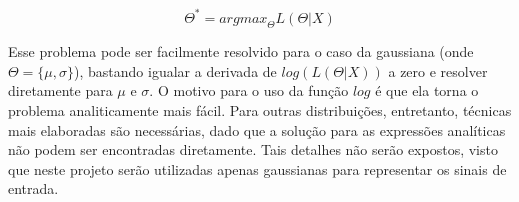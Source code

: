 \begin{equation}\label{eq:hmm14}
    {\Theta}^{\ast} = {{argmax}}_{\Theta}{L(\Theta|X)}
\end{equation}

Esse problema pode ser facilmente resolvido para o caso da gaussiana (onde $ \Theta = \{\mu,\sigma\} $), bastando igualar a derivada de $ log(L(\Theta|X)) $ a zero e resolver diretamente para $ \mu $ e $ \sigma $. O motivo para o uso da função $ log $ é que ela torna o problema analiticamente mais fácil. Para outras distribuições, entretanto, técnicas mais elaboradas são necessárias, dado que a solução para as expressões analíticas não podem ser encontradas diretamente. Tais detalhes não serão expostos, visto que neste projeto serão utilizadas apenas gaussianas para representar os sinais de entrada.
